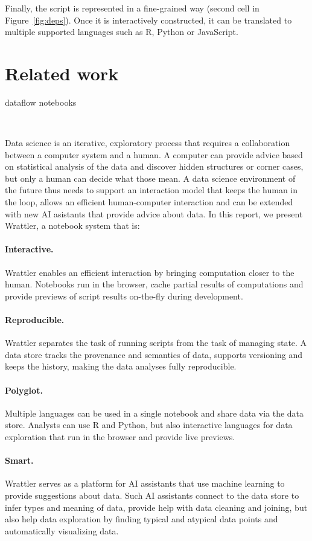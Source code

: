\documentclass[sigplan]{acmart}\settopmatter{printfolios=true,printccs=false,printacmref=false}
\begin{document}
Finally, the script is represented in a fine-grained way (second cell in Figure~\ref{fig:deps}).
Once it is interactively constructed, it can be translated to multiple supported languages
such as R, Python or JavaScript.


\section{Related work}

dataflow notebooks

\newpage
~
\newpage


Data science is an iterative, exploratory process that requires a collaboration between a 
computer system and a human. A computer can provide advice 
based on statistical analysis of the data and discover hidden structures or corner cases, but only
a human can decide what those mean.
A data science environment of the future thus needs to support an interaction model that 
keeps the human in the loop, allows an efficient human-computer interaction 
and can be extended with new AI asistants that provide advice about data.
In this report, we present Wrattler, a notebook system that is:

\paragraph{Interactive.}
Wrattler enables an efficient interaction by bringing computation closer to the human.
Notebooks run in the browser, cache partial results of computations and provide previews
of script results on-the-fly during development.

\paragraph{Reproducible.} 
Wrattler separates the task of running scripts from the task of managing state.
A data store tracks the provenance and semantics of data, supports versioning and keeps 
the history, making the data analyses fully reproducible.

\paragraph{Polyglot.}
Multiple languages can be used in a single notebook and share data via the data store.
Analysts can use R and Python, but also interactive languages for data exploration
that run in the browser and provide live previews.

\paragraph{Smart.}
Wrattler serves as a platform for AI assistants that use machine learning to provide suggestions 
about data. Such AI assistants connect to the data store to infer types and meaning of data, provide 
help with data cleaning and joining, but also help data exploration by finding typical and atypical 
data points and automatically visualizing data.
\end{document}
